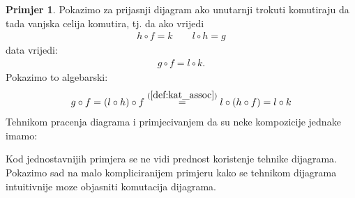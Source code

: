 \documentclass[11pt]{article}
\theoremstyle{definition}
\newtheorem{primjer}{Primjer}
\begin{document}
  \begin{primjer} Pokazimo za prijasnji dijagram ako unutarnji trokuti
    komutiraju da tada vanjska celija komutira, tj. da ako vrijedi
    \begin{align*}
      h \circ f = k \qquad  l \circ h = g
    \end{align*}
    data vrijedi:
    \begin{align*}
      g \circ f = l \circ k.
    \end{align*}
    Pokazimo to algebarski:
    \begin{align*}
      g \circ f = (l \circ h) \circ f \overset{(\ref{def:kat_assoc})}{=} l \circ (h \circ f) = l \circ k
    \end{align*}
    Tehnikom pracenja diagrama i primjecivanjem da su neke kompozicije jednake
    imamo:
    \begin{center}
    \end{center}
  \end{primjer}

  Kod jednostavnijih primjera se ne vidi prednost koristenje tehnike dijagrama.
  Pokazimo sad na malo kompliciranijem primjeru kako se tehnikom dijagrama
  intuitivnije moze objasniti komutacija dijagrama.
\end{document}
